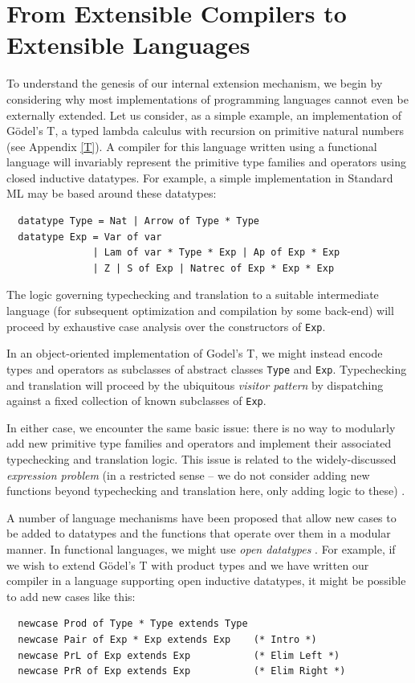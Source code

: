 \documentclass{llncs}
\begin{document}
\section{From Extensible Compilers to Extensible Languages}\label{evolution}
To understand the genesis of our internal extension mechanism, we begin by considering why most implementations of programming languages cannot even be  externally extended. 
Let us consider, as a simple example, an implementation of G\"odel's T, a typed lambda calculus with recursion on primitive natural numbers (see Appendix \ref{T}). 
A compiler for this language written using a functional language will invariably represent the primitive type families and operators using {closed} inductive datatypes. 
For example, a simple implementation in Standard ML may be based around these datatypes:
\begin{lstlisting}
  datatype Type = Nat | Arrow of Type * Type
  datatype Exp = Var of var 
               | Lam of var * Type * Exp | Ap of Exp * Exp 
               | Z | S of Exp | Natrec of Exp * Exp * Exp
\end{lstlisting}

The logic governing typechecking and translation to a suitable intermediate language (for subsequent optimization and compilation by some back-end) will proceed by exhaustive case analysis over the constructors of \lstinline{Exp}.

In an object-oriented implementation of Godel's T, we might instead encode types and operators as subclasses of abstract classes \lstinline{Type} and \lstinline{Exp}. Typechecking and translation will proceed by the ubiquitous \emph{visitor pattern} \cite{visitor} by dispatching against a fixed collection of {known} subclasses of \lstinline{Exp}. 

In either case, we encounter the same basic issue: there is no way to modularly add new primitive type families and operators and implement their associated typechecking and translation logic. 
This issue is related to the widely-discussed \emph{expression problem} (in a restricted sense -- we do not consider adding new functions beyond typechecking and translation here, only adding logic to these) \cite{wadler-expression}.

A number of language mechanisms have been proposed that allow new cases to be added to datatypes and the functions that operate over them in a modular manner. 
In functional languages, we might use \emph{open datatypes} \cite{open-datatypes}. For example, if we wish to extend G\"odel's T with product types and we have written our compiler in a language supporting open inductive datatypes, it might be possible to add new cases like this: 
\begin{lstlisting}
  newcase Prod of Type * Type extends Type
  newcase Pair of Exp * Exp extends Exp    (* Intro *)
  newcase PrL of Exp extends Exp           (* Elim Left *)
  newcase PrR of Exp extends Exp           (* Elim Right *)
\end{lstlisting}
\end{document}

